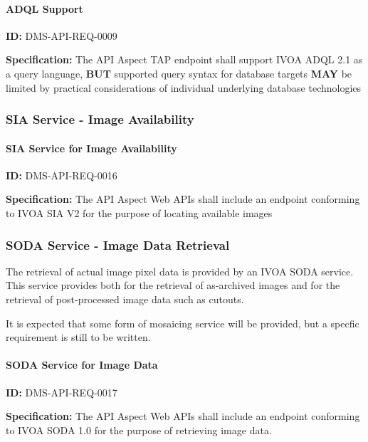 \documentclass[SE,toc]{lsstdoc}
\begin{document}
\paragraph{ADQL Support}\hfill  %

\label{DMS-API-REQ-0009}
\textbf{ID:} DMS-API-REQ-0009

\textbf{Specification:}
The API Aspect TAP endpoint shall support IVOA ADQL 2.1 as a query language, \textbf{BUT} supported query syntax for database targets \textbf{MAY} be limited by practical considerations of individual underlying database technologies

\subsubsection{SIA Service - Image Availability}

\paragraph{SIA Service for Image Availability}\hfill  %

\label{DMS-API-REQ-0016}
\textbf{ID:} DMS-API-REQ-0016

\textbf{Specification:}
The API Aspect Web APIs shall include an endpoint conforming to IVOA SIA V2 for the purpose of locating available images

\subsubsection{SODA Service - Image Data Retrieval}

The retrieval of actual image pixel data is provided by an IVOA SODA service.  This service provides both for the retrieval of as-archived images and for the retrieval of post-processed image data such as cutouts.

It is expected that some form of mosaicing service will be provided, but a specfic requirement is still to be written.

\paragraph{SODA Service for Image Data}\hfill  %

\label{DMS-API-REQ-0017}
\textbf{ID:} DMS-API-REQ-0017

\textbf{Specification:}
The API Aspect Web APIs shall include an endpoint conforming to IVOA SODA 1.0 for the purpose of retrieving image data.
\end{document}

